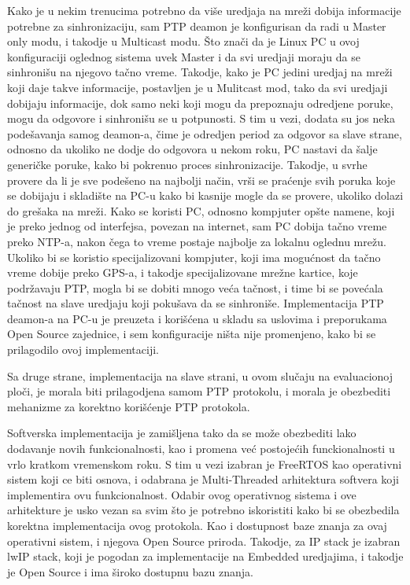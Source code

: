 \documentclass[a4paper,12pt, master]{etf}
\begin{document}
        Kako je u nekim trenucima potrebno da vi\v{s}e uredjaja na mre\v{z}i
        dobija informacije potrebne za sinhronizaciju, sam PTP deamon je
        konfigurisan da radi u Master only modu, i takodje u Multicast modu.
        \v{S}to zna\v{c}i da je Linux PC u ovoj konfiguraciji oglednog sistema
        uvek Master i da svi uredjaji moraju da se sinhroni\v{s}u na njegovo
        ta\v{c}no vreme. Takodje, kako je PC jedini uredjaj na mre\v{z}i koji
        daje takve informacije, postavljen je u Mulitcast mod, tako da svi
        uredjaji dobijaju informacije, dok samo neki koji mogu da prepoznaju
        odredjene poruke, mogu da odgovore i sinhroni\v{s}u se u potpunosti. S
        tim u vezi, dodata su jos neka pode\v{s}avanja samog deamon-a, \v{c}ime
        je odredjen period za odgovor sa slave strane, odnosno da ukoliko ne
        dodje do odgovora u nekom roku, PC nastavi da \v{s}alje generi\v{c}ke
        poruke, kako bi pokrenuo proces sinhronizacije. Takodje, u svrhe
        provere da li je sve pode\v{s}eno na najbolji na\v{c}in, vr\v{s}i se
        pra\'{c}enje svih poruka koje se dobijaju i skladi\v{s}te na PC-u kako
        bi kasnije mogle da se provere, ukoliko dolazi do gre\v{s}aka na
        mre\v{z}i. Kako se koristi PC, odnosno kompjuter op\v{s}te namene, koji
        je preko jednog od interfejsa, povezan na internet, sam PC dobija
        ta\v{c}no vreme preko NTP-a, nakon \v{c}ega to vreme postaje najbolje
        za lokalnu oglednu mre\v{z}u. Ukoliko bi se koristio specijalizovani
        kompjuter, koji ima mogu\'{c}nost da ta\v{c}no vreme dobije preko
        GPS-a, i takodje specijalizovane mre\v{z}ne kartice, koje
        podr\v{z}avaju PTP, mogla bi se dobiti mnogo ve\'{c}a ta\v{c}nost, i
        time bi se pove\'{c}ala ta\v{c}nost na slave uredjaju koji poku\v{s}ava
        da se sinhroni\v{s}e. Implementacija PTP deamon-a na PC-u je preuzeta i
        kori\v{s}\'{c}ena u skladu sa uslovima i preporukama Open Source
        zajednice, i sem konfiguracije ni\v{s}ta nije promenjeno, kako bi se
        prilagodilo ovoj implementaciji.

        Sa druge strane, implementacija na slave strani, u ovom slu\v{c}aju na
        evaluacionoj plo\v{c}i, je morala biti prilagodjena samom PTP
        protokolu, i morala je obezbediti mehanizme za korektno kori\v{s}\'{c}enje
        PTP protokola.

        Softverska implementacija je zami\v{s}ljena tako da se mo\v{z}e
        obezbediti lako dodavanje novih funkcionalnosti, kao i promena ve\'{c}
        postoje\'{c}ih funckionalnosti u vrlo kratkom vremenskom roku. S tim u
        vezi izabran je FreeRTOS kao operativni sistem koji ce biti osnova, i
        odabrana je Multi-Threaded arhitektura softvera koji implementira ovu
        funkcionalnost. Odabir ovog operativnog sistema i ove arhitekture je
        usko vezan sa svim \v{s}to je potrebno iskoristiti kako bi se
        obezbedila korektna implementacija ovog protokola. Kao i dostupnost
        baze znanja za ovaj operativni sistem, i njegova Open Source priroda.
        Takodje, za IP stack je izabran lwIP stack, koji je pogodan za
        implementacije na Embedded uredjajima, i takodje je Open Source i ima
        \v{s}iroko dostupnu bazu znanja.
\end{document}
